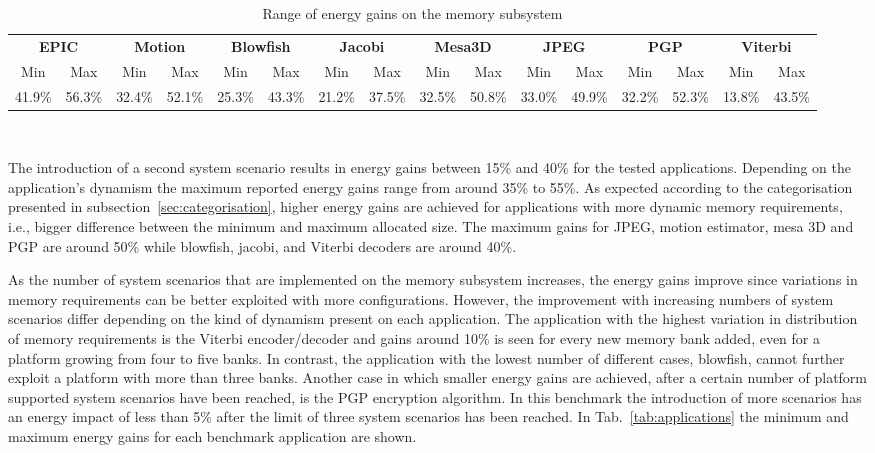 \documentclass{acm_proc_article-sp}
\begin{document}
\begin{center}
	\begin{table*}[!t]
	\caption{Range of energy gains on the memory subsystem}
	\label{tab:ranges}
	{\small
	\hfill{}
	\begin{tabular}{|c|c|c|c|c|c|c|c|c|c|c|c|c|c|c|c|}
		\hline
		\multicolumn{2}{|c|}{\textbf{EPIC}} &
		\multicolumn{2}{c|}{\textbf{Motion}} &
		\multicolumn{2}{c|}{\textbf{Blowfish}} &
		\multicolumn{2}{c|}{\textbf{Jacobi}} &
		\multicolumn{2}{c|}{\textbf{Mesa3D}} &
		\multicolumn{2}{c|}{\textbf{JPEG}} &
		\multicolumn{2}{c|}{\textbf{PGP}} &
		\multicolumn{2}{c|}{\textbf{Viterbi}} \\ 
		\cline{1-16}
		Min & Max & Min & Max & Min & Max & 
		Min & Max & Min & Max & Min & Max & 
		Min & Max & Min & Max\\ 
		\hline 
		41.9\% & 56.3\% & 32.4\% & 52.1\% & 25.3\% & 43.3\% & 
		21.2\% & 37.5\% & 32.5\% & 50.8\% & 33.0\% & 49.9\% & 
		32.2\% & 52.3\% & 13.8\% & 43.5\% \\ 
		\hline 
	\end{tabular}}
	\hfill{}
	\\
	\end{table*}
\end{center}

The introduction of a second system scenario results in energy gains between 15\% and  40\%  for the tested applications. Depending on the application's dynamism the maximum reported energy gains range from around 35\% to 55\%. As expected according to the categorisation presented in subsection~\ref{sec:categorisation}, higher energy gains are achieved for applications with more dynamic memory requirements, i.e., bigger difference between the minimum and maximum allocated size. The maximum gains for JPEG, motion estimator, mesa 3D and PGP are around 50\% while blowfish, jacobi, and Viterbi decoders are around 40\%.

As the number of system scenarios that are implemented on the memory subsystem increases, the energy gains improve since variations in memory requirements can be better exploited with more configurations. However, the improvement with increasing numbers of system scenarios differ depending on the kind of dynamism present on each application. The application with the highest variation in distribution of memory requirements is the Viterbi encoder/decoder and gains around 10\% is seen for every new memory bank added, even for a platform growing from four to five banks. In contrast, the application with the lowest number of different cases, blowfish, cannot further exploit a platform with more than three banks. Another case in which smaller energy gains are achieved, after a certain number of platform supported system scenarios have been reached, is the PGP encryption algorithm. In this benchmark the introduction of more scenarios has an energy impact of less than 5\% after the limit of three system scenarios has been reached. In Tab.~\ref{tab:applications} the minimum and maximum energy gains for each benchmark application are shown.
\end{document}
